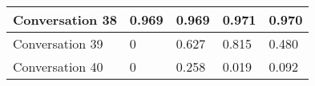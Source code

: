 \begin{table}
\begin{tabular}{|l|l|l|l|l|}
Conversation 38  & 0.969    & 0.969 & 0.971       & 0.970   \\ \hline
Conversation 39  & 0        & 0.627 & 0.815       & 0.480   \\ \hline
Conversation 40  & 0        & 0.258 & 0.019       & 0.092   \\ \hline

\end{tabular}
\end{table}
